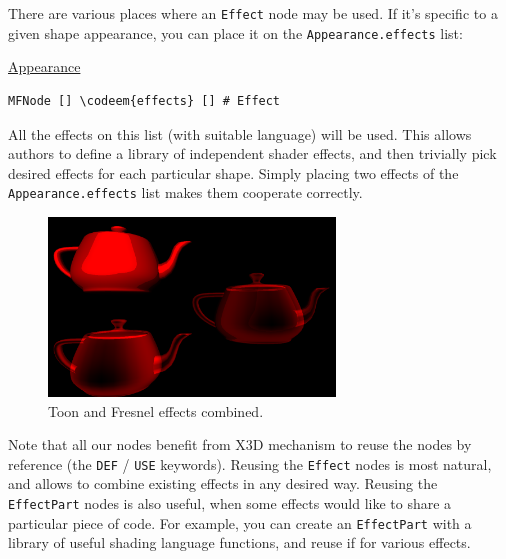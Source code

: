 \documentclass{egpubl}
\newenvironment{mycode}
{\begin{mycodecore}}
{\end{mycodecore}
\vspace{-0.1in}}
\newcommand*{\codeem}[1]{\textbf{#1}}
\begin{document}
There are various places where an \texttt{Effect} node may be used.
If it's specific to a given shape appearance, you can place it
on the \texttt{Appearance.effects} list:

\begin{mycode}
\underline{Appearance}
\begin{Verbatim}[commandchars=\\\{\}]
MFNode [] \codeem{effects} [] # Effect
\end{Verbatim}
\end{mycode}

All the effects on this list (with suitable language) will be used.
This allows authors to define a library of independent shader effects,
and then trivially pick desired effects for each particular shape.
Simply placing two effects of the \texttt{Appearance.effects} list
makes them cooperate correctly.

\begin{figure}[H]
  \centering
  \includegraphics[width=3in]{fresnel_and_toon}
  \caption{Toon and Fresnel effects combined.}
\end{figure}

Note that all our nodes benefit from X3D mechanism to reuse the nodes
by reference (the \texttt{DEF} / \texttt{USE} keywords). Reusing the
\texttt{Effect} nodes
is most natural, and allows to combine existing effects in any desired way.
Reusing the \texttt{EffectPart} nodes is also useful, when some effects
would like to share a particular piece of code. For example,
you can create an \texttt{EffectPart} with a library of useful
shading language functions, and reuse if for various effects.
\end{document}
